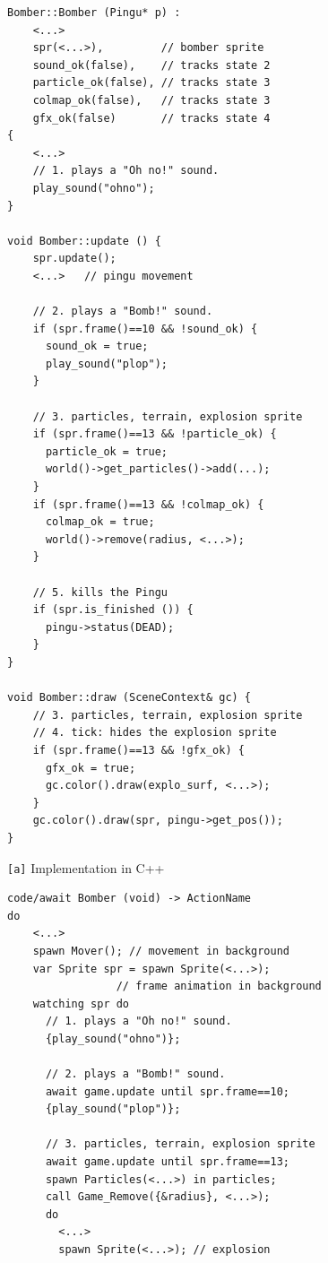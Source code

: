 \documentclass[10pt, conference, compsocconf]{IEEEtran}
\newcommand{\code}[1] {{\small{\texttt{#1}}}}
\newcommand{\ax}{\code{[a]}\xspace}
\begin{document}
\begin{figure}
\begin{minipage}[t]{0.50\linewidth}
\begin{lstlisting}[numbers=right]
Bomber::Bomber (Pingu* p) :
    <...>
    spr(<...>),         // bomber sprite
    sound_ok(false),    // tracks state 2
    particle_ok(false), // tracks state 3
    colmap_ok(false),   // tracks state 3
    gfx_ok(false)       // tracks state 4
{
    <...>
    // 1. plays a "Oh no!" sound.
    play_sound("ohno");
}

void Bomber::update () {
    spr.update();
    <...>   // pingu movement

    // 2. plays a "Bomb!" sound.
    if (spr.frame()==10 && !sound_ok) {
      sound_ok = true;
      play_sound("plop");
    }

    // 3. particles, terrain, explosion sprite
    if (spr.frame()==13 && !particle_ok) {
      particle_ok = true;
      world()->get_particles()->add(...);
    }
    if (spr.frame()==13 && !colmap_ok) {
      colmap_ok = true;
      world()->remove(radius, <...>);
    }

    // 5. kills the Pingu
    if (spr.is_finished ()) {
      pingu->status(DEAD);
    }
}

void Bomber::draw (SceneContext& gc) {
    // 3. particles, terrain, explosion sprite
    // 4. tick: hides the explosion sprite
    if (spr.frame()==13 && !gfx_ok) {
      gfx_ok = true;
      gc.color().draw(explo_surf, <...>);
    }
    gc.color().draw(spr, pingu->get_pos());
}
\end{lstlisting}
\centering\small{\ax Implementation in C++}
\end{minipage}
%
\begin{minipage}[t]{0.50\linewidth}
\begin{lstlisting}[xleftmargin=2em]
code/await Bomber (void) -> ActionName
do
    <...>
    spawn Mover(); // movement in background
    var Sprite spr = spawn Sprite(<...>);
                 // frame animation in background
    watching spr do
      // 1. plays a "Oh no!" sound.
      {play_sound("ohno")};

      // 2. plays a "Bomb!" sound.
      await game.update until spr.frame==10;
      {play_sound("plop")};

      // 3. particles, terrain, explosion sprite
      await game.update until spr.frame==13;
      spawn Particles(<...>) in particles;
      call Game_Remove({&radius}, <...>);
      do
        <...>
        spawn Sprite(<...>); // explosion


\end{lstlisting}
\end{minipage}
\end{figure}
\end{document}
